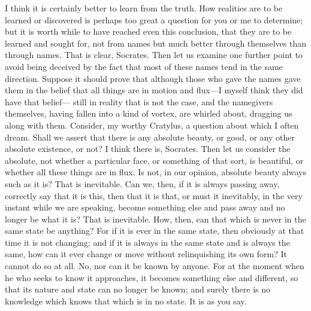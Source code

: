 {{{{{\cratylusspeaks
I think it is certainly better to learn from the truth.
\socratesspeaks
How realities are to be learned or discovered is perhaps too great a question for you or me to determine; but it is worth while to have reached even this conclusion, that they are to be learned and sought for, not from names but much better through themselves than through names.
\cratylusspeaks
That is clear, Socrates.
\socratesspeaks
Then let us examine one further point to avoid being deceived by the fact that most of these names tend in the same direction.  Suppose it should prove that although those who gave the names gave them in the belief that all things are in motion and flux—I myself think they did have that belief— still in reality that is not the case, and the namegivers themselves, having fallen into a kind of vortex, are whirled about, dragging us along with them. Consider, my worthy Cratylus, a question about which I often dream. Shall we assert that there is any absolute beauty, or good, or any other absolute existence,  or not?
\cratylusspeaks
I think there is, Socrates.
\socratesspeaks
Then let us consider the absolute, not whether a particular face, or something of that sort, is beautiful, or whether all these things are in flux. Is not, in our opinion, absolute beauty always such as it is?
\cratylusspeaks
That is inevitable.
\socratesspeaks
Can we, then, if it is always passing away, correctly say that it is this, then that it is that, or must it inevitably, in the very instant while we are speaking, become something else and pass away and no longer be what it is?
\cratylusspeaks
That is inevitable. 
\socratesspeaks
How, then, can that which is never in the same state be anything? For if it is ever in the same state, then obviously at that time it is not changing; and if it is always in the same state and is always the same, how can it ever change or move without relinquishing its own form?
\cratylusspeaks
It cannot do so at all.
\socratesspeaks
No, nor can it be known by anyone.  For at the moment when he who seeks to know it approaches, it becomes something else and different, so that its nature and state can no longer be known; and surely there is no knowledge which knows that which is in no state.
\cratylusspeaks
It is as you say.
\socratesspeaks
}}}}}
